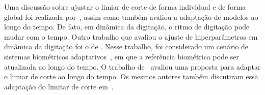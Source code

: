 Uma discussão sobre ajustar o limiar de corte de forma individual e de forma global foi realizada por~, assim como também avaliou a adaptação de modelos ao longo do tempo. De fato, em dinâmica da digitação, o ritmo de digitação pode mudar com o tempo. Outro trabalho que avaliou o ajuste de hiperparâmetros em dinâmica da digitação foi o de . Nesse trabalho, foi considerado um cenário de sistemas biométricos adaptativos~\cite{Ryu2023Design}, em que a referência biométrica pode ser atualizada ao longo do tempo. O trabalho de~ avaliou uma proposta para adaptar o limiar de corte ao longo do tempo. Os mesmos autores também discutiram essa adaptação do limitar de corte em~\cite{Mhenni2019DoubleSerial}.
